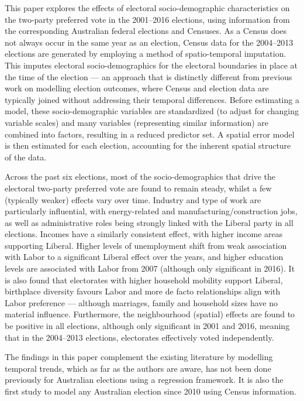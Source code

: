 \documentclass[11pt,a4paper,]{article}
\begin{document}
This paper explores the effects of electoral socio-demographic
characteristics on the two-party preferred vote in the 2001--2016
elections, using information from the corresponding Australian federal
elections and Censuses. As a Census does not always occur in the same
year as an election, Census data for the 2004--2013 elections are
generated by employing a method of spatio-temporal imputation. This
imputes electoral socio-demographics for the electoral boundaries in
place at the time of the election --- an approach that is distinctly
different from previous work on modelling election outcomes, where
Census and election data are typically joined without addressing their
temporal differences. Before estimating a model, these socio-demographic
variables are standardized (to adjust for changing variable scales) and
many variables (representing similar information) are combined into
factors, resulting in a reduced predictor set. A spatial error model is
then estimated for each election, accounting for the inherent spatial
structure of the data.

Across the past six elections, most of the socio-demographics that drive
the electoral two-party preferred vote are found to remain steady,
whilst a few (typically weaker) effects vary over time. Industry and
type of work are particularly influential, with energy-related and
manufacturing/construction jobs, as well as administrative roles being
strongly linked with the Liberal party in all elections. Incomes have a
similarly consistent effect, with higher income areas supporting
Liberal. Higher levels of unemployment shift from weak association with
Labor to a significant Liberal effect over the years, and higher
education levels are associated with Labor from 2007 (although only
significant in 2016). It is also found that electorates with higher
household mobility support Liberal, birthplace diversity favours Labor
and more de facto relationships align with Labor preference --- although
marriages, family and household sizes have no material influence.
Furthermore, the neighbourhood (spatial) effects are found to be
positive in all elections, although only significant in 2001 and 2016,
meaning that in the 2004--2013 elections, electorates effectively voted
independently.

The findings in this paper complement the existing literature by
modelling temporal trends, which as far as the authors are aware, has
not been done previously for Australian elections using a regression
framework. It is also the first study to model any Australian election
since 2010 using Census information.
\end{document}
